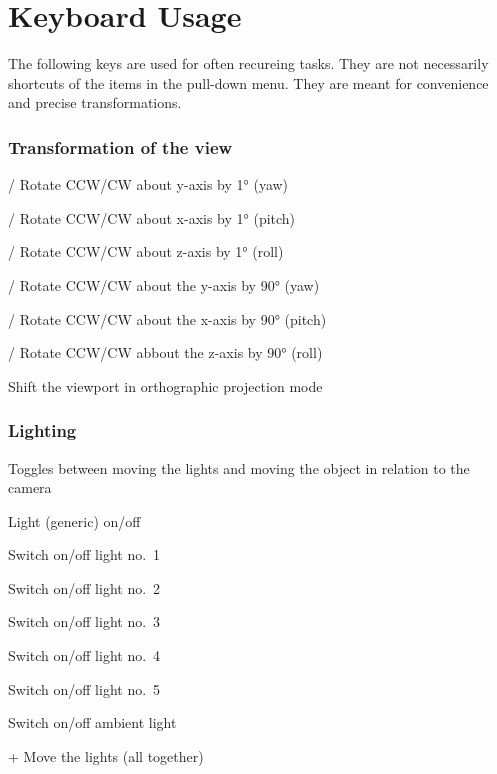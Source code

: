 \appendix
\chapter{Keyboard Usage}
\label{keyboard}
The following keys are used for often recureing tasks. They are not necessarily shortcuts of the items in the pull-down menu. They are meant for convenience and precise transformations.

\subsection*{Transformation of the view}
   
   / Rotate CCW/CW about y-axis by 1° (yaw)
   
   / Rotate CCW/CW about x-axis by 1° (pitch)
   
   /  Rotate CCW/CW about z-axis by 1° (roll)
   
   / Rotate CCW/CW about the y-axis by 90° (yaw)

   / Rotate CCW/CW about  the x-axis by 90° (pitch)   
   
   / Rotate CCW/CW abbout  the z-axis by 90° (roll)
   
   \LArrow \UArrow \DArrow \RArrow Shift the viewport in orthographic projection mode

\subsection*{Lighting}      
    Toggles between moving the lights and moving the object in relation to the camera 
   
    Light (generic) on/off
   
    Switch on/off light no.~1
   
    Switch on/off light no.~2
   
    Switch on/off light no.~3
   
    Switch on/off light no.~4
   
    Switch on/off light no.~5
   
    Switch on/off ambient light
   
   \Ctrl + \quad Move the lights (all together)

